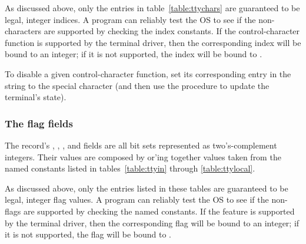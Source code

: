 As discussed above, 
only the {\Posix} entries in table~\ref{table:ttychars} are guaranteed
to be legal, integer indices.
A program can reliably test the OS to see if the non-{\Posix} 
characters are supported by checking the index constants.
If the control-character function is supported by the terminal driver, 
then the corresponding index will be bound to an integer;
if it is not supported, the index will be bound to \sharpf.

To disable a given control-character function, set its corresponding
entry in the  string to the
special character  
(and then use the  procedure
to update the terminal's state).

\subsubsection{The flag fields}
The  record's , ,
, and  fields are all bit sets
represented as two's-complement integers.
Their values are composed by or'ing together values taken from
the named constants listed in tables~\ref{table:ttyin} 
through \ref{table:ttylocal}.

As discussed above, 
only the {\Posix} entries listed in these tables are guaranteed
to be legal, integer flag values.
A program can reliably test the OS to see if the non-{\Posix} 
flags are supported by checking the named constants.
If the feature is supported by the terminal driver, 
then the corresponding flag will be bound to an integer;
if it is not supported, the flag will be bound to \sharpf.


